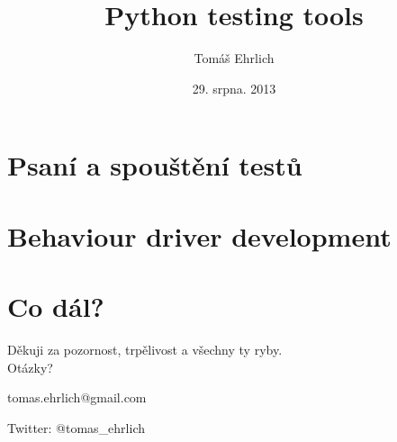 \documentclass{beamer}
\title{Python testing tools}
\author{Tomáš Ehrlich}
\date{29. srpna. 2013}
\begin{document}
\begin{frame}
\titlepage
\end{frame}

\section{Psaní a spouštění testů}






\section{Behaviour driver development}


\section{Co dál?}


\begin{frame}
\begin{center}
Děkuji za pozornost, trpělivost a všechny ty ryby.\\[2cm]

Otázky?

\vfill


tomas.ehrlich@gmail.com
\smallskip

Twitter: @tomas\_ehrlich
\end{center}
\end{frame}
\end{document}

